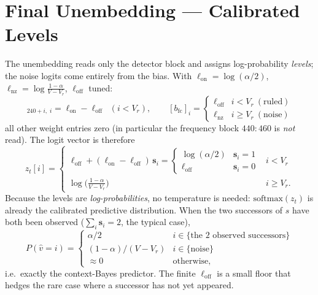 \documentclass[11pt]{article}
\newcommand{\T}{^{\!\top}}
\begin{document}
\section{Final Unembedding --- Calibrated Levels}
\label{sec:unembed}
The unembedding reads only the detector block and assigns log-probability \emph{levels}; the noise
logits come entirely from the bias. With $\ell_{\mathrm{on}}=\log(\alpha/2)$,
$\ell_{\mathrm{nz}}=\log\frac{1-\alpha}{V-V_r}$, $\ell_{\mathrm{off}}$ tuned:
\begin{equation}
[(W_{\mathrm{fc}})\T]_{\,240+i,\;i}=\ell_{\mathrm{on}}-\ell_{\mathrm{off}}\;\;(i<V_r),\qquad
[b_{\mathrm{fc}}]_i=
\begin{cases}\ell_{\mathrm{off}} & i<V_r\ (\text{ruled})\\[2pt]\ell_{\mathrm{nz}} & i\ge V_r\ (\text{noise})\end{cases}
\end{equation}
all other weight entries zero (in particular the frequency block $440{:}460$ is \emph{not} read).
The logit vector is therefore
\begin{equation}
z_t[i]=
\begin{cases}
\ell_{\mathrm{off}}+(\ell_{\mathrm{on}}-\ell_{\mathrm{off}})\,\mathbf{s}_i
=\begin{cases}\log(\alpha/2)&\mathbf{s}_i=1\\ \ell_{\mathrm{off}}&\mathbf{s}_i=0\end{cases} & i<V_r\\[10pt]
\log\!\big(\tfrac{1-\alpha}{V-V_r}\big) & i\ge V_r.
\end{cases}
\end{equation}
Because the levels are \emph{log-probabilities}, no temperature is needed: $\mathrm{softmax}(z_t)$
is already the calibrated predictive distribution. When the two successors of $s$ have both been
observed ($\sum_i\mathbf{s}_i=2$, the typical case),
\begin{equation}
P(\hat v=i)=
\begin{cases}\alpha/2 & i\in\{\text{the 2 observed successors}\}\\
(1-\alpha)/(V-V_r) & i\in\{\text{noise}\}\\
\approx 0 & \text{otherwise,}\end{cases}
\end{equation}
i.e.\ exactly the context-Bayes predictor. The finite $\ell_{\mathrm{off}}$ is a small floor that
hedges the rare case where a successor has not yet appeared.

\end{document}
